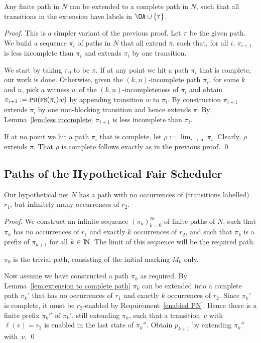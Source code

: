 \documentclass[smallcondensed]{svjour3}
\newcommand{\Lem}[1]{Lemma~\ref{lem:#1}}
\begin{document}
\begin{lemma}\label{lem:extension to complete path}
Any finite path in $N$ can be extended to a complete path in $N\!$, such that all transitions in the
extension have labels in $\OA\cup\{\tau\}$.
\end{lemma}
\begin{proof}
This is a simpler variant of the previous proof.
Let $\pi$ be the given path.
We build a sequence $\pi_i$ of paths in $N$ that all extend $\pi$, such that, for all $i$,
$\pi_{i+1}$ is less incomplete than $\pi_i$ and extends $\pi_i$ by one transition.

We start by taking $\pi_0$ to be $\pi$.
If at any point we hit a path $\pi_i$ that is complete, our work is done.
Otherwise, given the $(k,n)$-incomplete path $\pi_i$, for some $k$ and $n$,
pick a witness $w$ of the $(k,n)$-incompleteness of $\pi_i$
and obtain $\pi_{i+1} := \mbox{\sc ph}(\mbox{\sc fs}(\pi_i)w)$
by appending transition $w$ to $\pi_i$.
By construction $\pi_{i+1}$ extends $\pi_i$ by one non-blocking transition and hence extends $\pi$.
By \Lem{less incomplete} $\pi_{i+1}$ is less incomplete than $\pi_i$.

If at no point we hit a path $\pi_i$ that is complete, let $\rho:=\lim_{i\rightarrow\infty}\pi_i$.
Clearly, $\rho$ extends $\pi$. That $\rho$ is complete follows exactly as in the previous proof.
\qed
\end{proof}

\subsection{Paths of the Hypothetical Fair Scheduler}

\begin{lemma}\label{lem:PN1}
  Our hypothetical net $N$ has a path with no occurrences of (transitions labelled) $r_1$, but infinitely many occurrences
  of $r_2$.
\end{lemma}
\begin{proof}
We construct an infinite sequence $(\pi_k)_{k=0}^\infty$ of finite paths of $N$,
such that $\pi_k$ has no occurrences of $r_1$ and exactly $k$ occurrences
of $r_2$, and such that $\pi_k$ is a prefix of $\pi_{k+1}$ for all $k\in\mathop{\rm I\mkern-2.5mu N}\nolimits $.
The limit of this sequence will be the required path.

$\pi_0$ is  the trivial path, consisting of the initial marking $M_0$ only.

Now assume we have constructed a path $\pi_k$ as required.
By \Lem{extension to complete path} $\pi_k$ can be extended into a complete path $\pi_k'$ that has no occurrences of $r_1$ and
exactly $k$ occurrences of $r_2$. Since $\pi_k'$ is complete, it must be $r_2$-enabled by Requirement~\ref{enabled PN}.
Hence there is a finite prefix $\pi_k''$ of $\pi_k'$, still extending $\pi_k$, such that a
transition~$v$ with $\ell(v)=r_2$ is enabled in the last state of $\pi_k''$.
Obtain $p_{k+1}$ by extending $\pi_k''$ with~$v$.
\qed
\end{proof}
\end{document}
